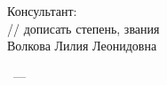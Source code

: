 \vspace{0pt plus1fill} %
\begin{flushright}%
    Консультант: \\
    // дописать степень, звания \\
    Волкова Лилия Леонидовна \\
\end{flushright}%

\vspace{0pt plus4fill} %
\begin{center}%
    {\thesisCity~--- \thesisYear}
\end{center}%

\newpage

